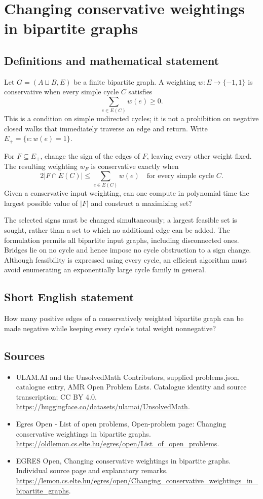 \documentclass[11pt,a4paper]{article}
\begin{document}
\section*{Changing conservative weightings in bipartite graphs}\label{statement}

\subsection{Definitions and mathematical statement}
Let $G=(A\sqcup B,E)$ be a finite bipartite graph. A weighting
$w:E\to\{-1,1\}$ is conservative when every simple cycle $C$ satisfies
\[
                              \sum_{e\in E(C)}w(e)\ge0.
\]
This is a condition on simple undirected cycles; it is not a prohibition
on negative closed walks that immediately traverse an edge and return.
Write $E_+=\{e:w(e)=1\}$.

For $F\subseteq E_+$, change the sign of the edges of $F$, leaving every
other weight fixed. The resulting weighting $w_F$ is conservative exactly
when
\[
                  2|F\cap E(C)|\le\sum_{e\in E(C)}w(e)
                                      \quad\text{for every simple cycle }C.
\]
Given a conservative input weighting, can one compute in polynomial time
the largest possible value of $|F|$ and construct a maximizing set?

The selected signs must be changed simultaneously; a largest feasible
set is sought, rather than a set to which no additional edge can be added.
The formulation permits all bipartite input graphs, including disconnected
ones. Bridges lie on no cycle and hence impose no cycle obstruction to a
sign change. Although feasibility is expressed using every cycle, an
efficient algorithm must avoid enumerating an exponentially large cycle
family in general.
\subsection{Short English statement}
How many positive edges of a conservatively weighted bipartite
graph can be made negative while keeping every cycle's total weight nonnegative?
\subsection{Sources}
\begin{itemize}
\item[S1] ULAM.AI and the UnsolvedMath Contributors, supplied problems.json, catalogue entry, AMR Open Problem Lists. Catalogue identity and source transcription; CC BY 4.0.
\url{https://huggingface.co/datasets/ulamai/UnsolvedMath}.
\item[S2] Egres Open - List of open problems, Open-problem page: Changing conservative weightings in bipartite graphs. 
\url{https://oldlemon.cs.elte.hu/egres/open/List_of_open_problems}.
\item[S3] EGRES Open, Changing conservative weightings in bipartite graphs. Individual source page and explanatory remarks.
\url{https://lemon.cs.elte.hu/egres/open/Changing_conservative_weightings_in_bipartite_graphs}.
\end{itemize}
\end{document}
